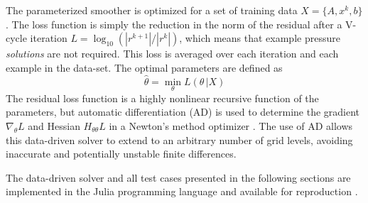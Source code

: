 \documentclass[review]{elsarticle}
\begin{document}
The parameterized smoother is optimized for a set of training data $X=\{A,x^k,b\}$. The loss function is simply the reduction in the norm of the residual after a V-cycle iteration $L = \log_{10}(|r^{k+1}| / |r^{k}|)$, which means that example pressure \textit{solutions} are not required. This loss is averaged over each iteration and each example in the data-set. The optimal parameters are defined as
\begin{equation}
    \hat\theta = \min_\theta L(\theta\, |X)
\end{equation}
The residual loss function is a highly nonlinear recursive function of the parameters, but automatic differentiation (AD) is used to determine the gradient $\nabla_\theta L$ and Hessian $H_{\theta\theta} L$ in a Newton's method optimizer  \cite{mogensen2018optim,RevelsLubinPapamarkou2016}. The use of AD allows this data-driven solver to extend to an arbitrary number of grid levels, avoiding inaccurate and potentially unstable finite differences.

The data-driven solver and all test cases presented in the following sections are implemented in the Julia programming language \cite{bezanson2017julia} and available for reproduction \cite{weymouth2021julia}.
\end{document}
